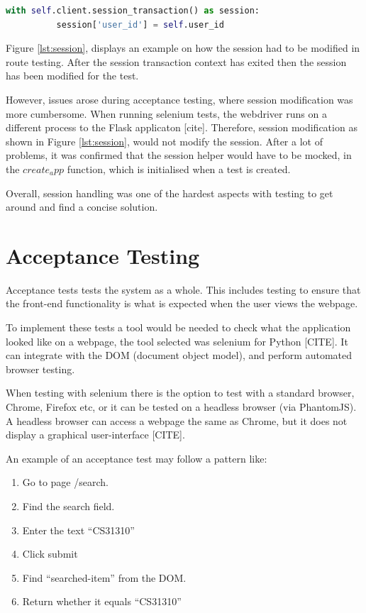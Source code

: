\begin{lstlisting}[language=python, label={lst:session}, breaklines, columns=fullflexible, keywordstyle=\color{blue}]
  with self.client.session_transaction() as session:
          session['user_id'] = self.user_id
\end{lstlisting}

Figure \ref{lst:session}, displays an example on how the session had to be modified in route testing. After the session transaction context has exited then the session has been modified for the test.

However, issues arose during acceptance testing, where session modification was more cumbersome.  When running selenium tests, the webdriver runs on a different process to the Flask applicaton [cite]. Therefore, session modification as shown in Figure \ref{lst:session}, would not modify the session. After a lot of problems, it was confirmed that the session helper would have to be mocked, in the $create_app$ function, which is initialised when a test is created.

Overall, session handling was one of the hardest aspects with testing to get around and find a concise solution.

\section{Acceptance Testing}
Acceptance tests tests the system as a whole. This includes testing to ensure that the front-end functionality is what is expected when the user views the webpage.

To implement these tests a tool would be needed to check what the application looked like on a webpage, the tool selected was selenium for Python [CITE]. It can integrate with the DOM (document object model), and perform automated browser testing.

When testing with selenium there is the option to test with a standard browser, Chrome, Firefox etc, or it can be tested on a headless browser (via PhantomJS). A headless browser can access a webpage the same as Chrome, but it does not display a graphical user-interface [CITE].

An example of an acceptance test may follow a pattern like:
\begin{enumerate}
  \item Go to page /search.
  \item Find the search field.
  \item Enter the text ``CS31310''
  \item Click submit
  \item Find ``searched-item'' from the DOM.
  \item Return whether it equals ``CS31310''
\end{enumerate}


